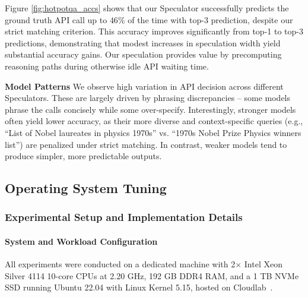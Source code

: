 Figure \ref{fig:hotpotqa_accs} shows that our Speculator successfully predicts the ground truth API call up to $46\%$ of the time with top-3 prediction, despite our strict matching criterion. This accuracy improves significantly from top-1 to top-3 predictions, demonstrating that modest increases in speculation width yield substantial accuracy gains. Our speculation provides value by precomputing reasoning paths during otherwise idle API waiting time. 

 


\textbf{Model Patterns} We observe high variation in API decision across different Speculators. These are largely driven by phrasing discrepancies -- some models phrase the calls concisely while some over-specify. Interestingly, stronger models often yield lower accuracy, as their more diverse and context-specific queries (e.g., “List of Nobel laureates in physics 1970s” vs. “1970s Nobel Prize Physics winners list”) are penalized under strict matching. In contrast, weaker models tend to produce simpler, more predictable outputs.







\subsection{Operating System Tuning}
\newcommand{\ttt}[1]{\texttt{#1}}

\subsubsection{Experimental Setup and Implementation Details}

\paragraph{System and Workload Configuration}
All experiments were conducted on a dedicated machine with 2$\times$ Intel Xeon Silver 4114 10-core CPUs at 2.20 GHz, 192 GB DDR4 RAM, and a 1 TB NVMe SSD running Ubuntu 22.04 with Linux Kernel 5.15, hosted on Cloudlab~\citep{Duplyakin:ATC19}.


